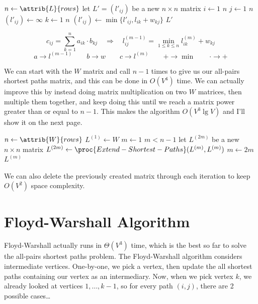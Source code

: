 \documentclass[11pt]{article}
\theoremstyle{definition}
\begin{document}
\begin{codebox}
  \li \(n \gets \attrib{L}{rows}\)
  \li let \(L' = (l'_{ij})\) be a new \(n \times n\) matrix
  \li \For \(i \gets 1\) \To \(n\) \Do
  \li \For \(j \gets 1\) \To \(n\) \Do
  \li \((l'_{ij}) \gets \infty\)
  \li \For \(k \gets 1\) \To \(n\) \Do
  \li \((l'_{ij}) \gets \min \{l'_{ij}, l_{ik} + w_{kj}\}\)
  \End \End \End 
  \li \Return \(L'\)
\end{codebox}
\[c_{ij} = \sum_{k=1}^n a_{ik} \cdot b_{kj} \quad\Rightarrow\quad
  l^{(m-1)}_{ij} = \displaystyle\min_{1 \leq k \leq n} l^{(m)}_{ik} + w_{kj}\]
  \[a \rightarrow l^{(m-1)} \quad\quad b \rightarrow w \quad\quad c \rightarrow  l^{(m)} 
  \quad\quad + \rightarrow \min \quad\quad \cdot \rightarrow +\]

We can start with the \(W\) matrix and call  \(n-1\) times to give 
us our all-pairs shortest paths matrix, and this can be done in \(O(V^4)\) time.  We can actually 
improve this by instead doing matrix multiplication on two \(W\) matrices, then multiple them 
together, and keep doing this until we reach a matrix power greater than or equal to \(n-1\). 
This makes the algorithm \(O(V^3 \lg V)\) and I'll show it on the next page.
\newpage

\begin{codebox}
  \li \(n \gets \attrib{W}{rows}\)
  \li \(L^{(1)} \gets W\)
  \li \(m \gets 1\)
  \li \While \(m < n-1\) \Do 
    \li let \(L^{(2m)}\) be a new \(n \times n\) matrix 
    \li \(L^{(2m)} \gets \proc{Extend-Shortest-Paths}(L^{(m)},L^{(m)})\)
    \li \(m \gets 2m\) \End 
  \li \Return \(L^{(m)}\)
\end{codebox}

We can also delete the previously created matrix through each iteration to keep \(O(V^2)\)
space complexity.

\section*{Floyd-Warshall Algorithm}
Floyd-Warshall actually runs in \(\Theta(V^3)\) time, which is the best so far to solve the 
all-pairs shortest paths problem. The Floyd-Warshall algorithm considers intermediate vertices. 
One-by-one, we pick a vertex, then update the all shortest paths containing our vertex as an 
intermediary.
Now, when we pick vertex \(k\), we already looked at vertices \(1,\dots,k-1\), so for every path 
\((i,j)\), there are 2 possible cases\dots
\end{document}
